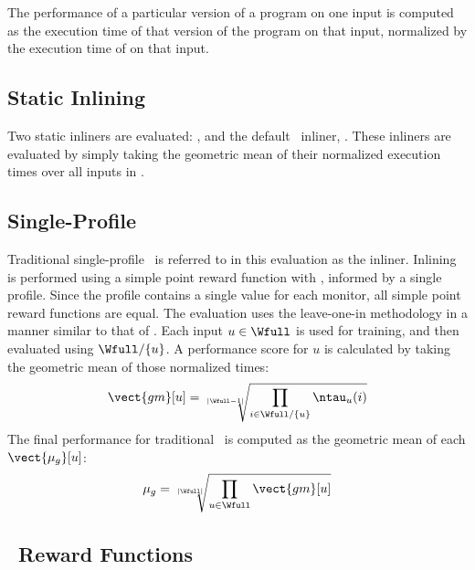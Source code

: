 The performance of a particular version of a program on one input is
computed as the execution time of that version of the program on that
input, normalized by the execution time of  on that
input.


\subsection{Static Inlining}

Two static inliners are evaluated: , and the
default \llvm\ inliner, .  These inliners are
evaluated by simply taking the geometric mean of their normalized
execution times over all inputs in \Wfull.

\subsection{Single-Profile \FDO}

Traditional single-profile \FDO\ is referred to in this evaluation as
the  inliner.  Inlining is performed using a simple
point reward function with \FDI, informed by a single profile.  Since
the profile contains a single value for each monitor, all simple point
reward functions are equal.  The evaluation uses the leave-one-in
methodology in a manner similar to that
of \cite{BerubePhD}. Each input $u \in \Wfull$ is used for
training, and then evaluated using $\Wfull/\{u\}$.  A performance score
for $u$ is calculated by taking the geometric mean of those normalized
times:
$$ \vect{gm}[u] = \sqrt[|\Wfull-1|]{ \prod_{i\in \Wfull/\{u\}} \ntau_u(i) } $$ 
The final performance for traditional \FDO\ is computed as the
geometric mean of each $\vect{\mu_g}[u]$:
$$ \mu_g = \sqrt[|\Wfull|]{ \prod_{u\in \Wfull} \vect{gm}[u] } $$


\subsection{\FDI\ Reward Functions}
\label{eval:rewards}

